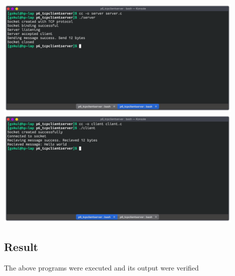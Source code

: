 \begin{center}
	\includegraphics[width=0.90\textwidth]{img/p7/ss1.png}
	\includegraphics[width=0.90\textwidth]{img/p7/ss2.png}
\end{center}


\subsection{Result}
The above programs were executed and its output were verified